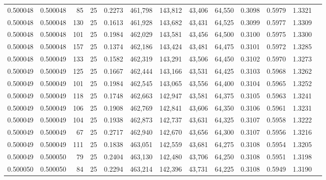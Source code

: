 \begin{tabular}{rrrrrrrrrrrrr}
0.500048 & 0.500048 &    85 &  25 &                                     0.2273 & 461,798 & 143,812 &  43,406 &  64,550 & 0.3098 & 0.5979 & 1.3321 \\
0.500048 & 0.500048 &   130 &  25 &                                     0.1613 & 461,928 & 143,682 &  43,431 &  64,525 & 0.3099 & 0.5977 & 1.3309 \\
0.500048 & 0.500048 &   101 &  25 &                                     0.1984 & 462,029 & 143,581 &  43,456 &  64,500 & 0.3100 & 0.5975 & 1.3300 \\
0.500048 & 0.500048 &   157 &  25 &                                     0.1374 & 462,186 & 143,424 &  43,481 &  64,475 & 0.3101 & 0.5972 & 1.3285 \\
0.500048 & 0.500049 &   133 &  25 &                                     0.1582 & 462,319 & 143,291 &  43,506 &  64,450 & 0.3102 & 0.5970 & 1.3273 \\
0.500049 & 0.500049 &   125 &  25 &                                     0.1667 & 462,444 & 143,166 &  43,531 &  64,425 & 0.3103 & 0.5968 & 1.3262 \\
0.500049 & 0.500049 &   101 &  25 &                                     0.1984 & 462,545 & 143,065 &  43,556 &  64,400 & 0.3104 & 0.5965 & 1.3252 \\
0.500049 & 0.500049 &   118 &  25 &                                     0.1748 & 462,663 & 142,947 &  43,581 &  64,375 & 0.3105 & 0.5963 & 1.3241 \\
0.500049 & 0.500049 &   106 &  25 &                                     0.1908 & 462,769 & 142,841 &  43,606 &  64,350 & 0.3106 & 0.5961 & 1.3231 \\
0.500049 & 0.500049 &   104 &  25 &                                     0.1938 & 462,873 & 142,737 &  43,631 &  64,325 & 0.3107 & 0.5958 & 1.3222 \\
0.500049 & 0.500049 &    67 &  25 &                                     0.2717 & 462,940 & 142,670 &  43,656 &  64,300 & 0.3107 & 0.5956 & 1.3216 \\
0.500049 & 0.500049 &   111 &  25 &                                     0.1838 & 463,051 & 142,559 &  43,681 &  64,275 & 0.3108 & 0.5954 & 1.3205 \\
0.500049 & 0.500050 &    79 &  25 &                                     0.2404 & 463,130 & 142,480 &  43,706 &  64,250 & 0.3108 & 0.5951 & 1.3198 \\
0.500050 & 0.500050 &    84 &  25 &                                     0.2294 & 463,214 & 142,396 &  43,731 &  64,225 & 0.3108 & 0.5949 & 1.3190 \\

\end{tabular}
